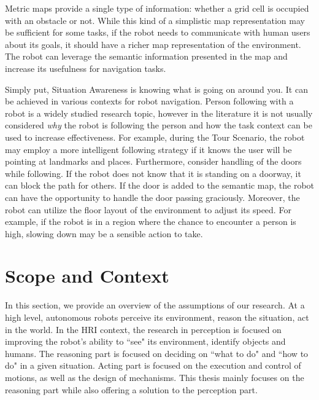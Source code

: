 Metric maps provide a single type of information: whether a grid cell is occupied with an obstacle or not. While this kind of a simplistic map representation may be sufficient for some tasks, if the robot needs to communicate with human users about its goals, it should have a richer map representation of the environment. The robot can leverage the semantic information presented in the map and increase its usefulness for navigation tasks.


Simply put, Situation Awareness is knowing what is going on around you. It can be achieved in various contexts for robot navigation. Person following with a robot is a widely studied research topic, however in the literature it is not usually considered \textit{why} the robot is following the person and how the task context can be used to increase effectiveness. For example, during the Tour Scenario, the robot may employ a more intelligent following strategy if it knows the user will be pointing at landmarks and places. Furthermore, consider handling of the doors while following. If the robot does not know that it is standing on a doorway, it can block the path for others. If the door is added to the semantic map, the robot can have the opportunity to handle the door passing graciously. Moreover, the robot can utilize the floor layout of the environment to adjust its speed. For example, if the robot is in a region where the chance to encounter a person is high, slowing down may be a sensible action to take.






\section{Scope and Context}

In this section, we provide an overview of the assumptions of our research.  At a high level, autonomous robots perceive its environment, reason the situation, act in the world. In the HRI context, the research in perception is focused on improving the robot's ability to ``see" its environment, identify objects and humans. The reasoning part is focused on deciding on ``what to do" and ``how to do" in a given situation. Acting part is focused on the execution and control of motions, as well as the design of mechanisms. This thesis mainly focuses on the reasoning part while also offering a solution to the perception part.

